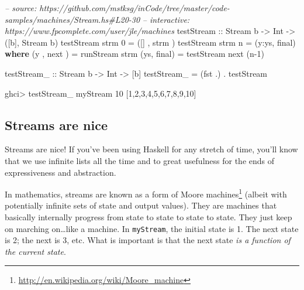 \documentclass[]{article}
\newenvironment{Shaded}{}{}
\newcommand{\KeywordTok}[1]{\textcolor[rgb]{0.00,0.44,0.13}{\textbf{{#1}}}}
\newcommand{\DataTypeTok}[1]{\textcolor[rgb]{0.56,0.13,0.00}{{#1}}}
\newcommand{\DecValTok}[1]{\textcolor[rgb]{0.25,0.63,0.44}{{#1}}}
\newcommand{\CommentTok}[1]{\textcolor[rgb]{0.38,0.63,0.69}{\textit{{#1}}}}
\newcommand{\OtherTok}[1]{\textcolor[rgb]{0.00,0.44,0.13}{{#1}}}
\newcommand{\FunctionTok}[1]{\textcolor[rgb]{0.02,0.16,0.49}{{#1}}}
\newcommand{\NormalTok}[1]{{#1}}
\renewcommand{\href}[2]{#2\footnote{\url{#1}}}
\begin{document}
\begin{Shaded}
\begin{Highlighting}[]
\CommentTok{-- source: https://github.com/mstksg/inCode/tree/master/code-samples/machines/Stream.hs#L20-30}
\CommentTok{-- interactive: https://www.fpcomplete.com/user/jle/machines}
\OtherTok{testStream ::} \DataTypeTok{Stream} \NormalTok{b }\OtherTok{->} \DataTypeTok{Int} \OtherTok{->} \NormalTok{([b], }\DataTypeTok{Stream} \NormalTok{b)}
\NormalTok{testStream strm }\DecValTok{0} \FunctionTok{=} \NormalTok{([]  , strm )}
\NormalTok{testStream strm n }\FunctionTok{=} \NormalTok{(y}\FunctionTok{:}\NormalTok{ys, final)}
  \KeywordTok{where}
    \NormalTok{(y , next )   }\FunctionTok{=} \NormalTok{runStream  strm}
    \NormalTok{(ys, final)   }\FunctionTok{=} \NormalTok{testStream next (n}\FunctionTok{-}\DecValTok{1}\NormalTok{)}

\OtherTok{testStream_ ::} \DataTypeTok{Stream} \NormalTok{b }\OtherTok{->} \DataTypeTok{Int} \OtherTok{->} \NormalTok{[b]}
\NormalTok{testStream_ }\FunctionTok{=} \NormalTok{(fst }\FunctionTok{.}\NormalTok{) }\FunctionTok{.} \NormalTok{testStream}
\end{Highlighting}
\end{Shaded}

\begin{Shaded}
\begin{Highlighting}[]
\NormalTok{ghci}\FunctionTok{>} \NormalTok{testStream_ myStream }\DecValTok{10}
\NormalTok{[}\DecValTok{1}\NormalTok{,}\DecValTok{2}\NormalTok{,}\DecValTok{3}\NormalTok{,}\DecValTok{4}\NormalTok{,}\DecValTok{5}\NormalTok{,}\DecValTok{6}\NormalTok{,}\DecValTok{7}\NormalTok{,}\DecValTok{8}\NormalTok{,}\DecValTok{9}\NormalTok{,}\DecValTok{10}\NormalTok{]}
\end{Highlighting}
\end{Shaded}

\subsection{Streams are nice}\label{streams-are-nice}

Streams are nice! If you've been using Haskell for any stretch of time,
you'll know that we use infinite lists all the time and to great
usefulness for the ends of expressiveness and abstraction.

In mathematics, streams are known as a form of
\href{http://en.wikipedia.org/wiki/Moore_machine}{Moore machines}
(albeit with potentially infinite sets of state and output values). They
are machines that basically internally progress from state to state to
state to state. They just keep on marching on\ldots{}like a machine. In
\texttt{myStream}, the initial state is 1. The next state is 2; the next
is 3, etc. What is important is that the next state \emph{is a function
of the current state}.
\end{document}
